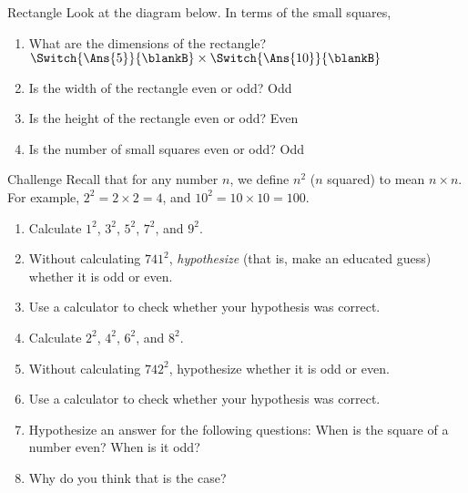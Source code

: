 \documentclass[12pt,letterpaper]{article}
\begin{document}
\begin{problem}{Rectangle}
 Look at the diagram below. In terms of the small squares,

 \begin{center}
 \end{center}

 \begin{enumerate}
  \item What are the dimensions of the rectangle? \hfill
  \(\Switch{\Ans{5}}{\blankB}\times\Switch{\Ans{10}}{\blankB}\)
  \item Is the width of the rectangle even or odd?
  \hfill Odd \hspace{1em} 
  \item Is the height of the rectangle even or odd?
  \hfill {} \hspace{1em} Even
  \item Is the number of small squares even or odd?
  \hfill Odd \hspace{1em} 
 \end{enumerate}
\end{problem}

\begin{problem}{Challenge}
 Recall that for any number $n$, we define $n^2$ ($n$ squared) to mean
 $n\times n$. For example, $2^2=2\times2=4$, and $10^2=10\times10=100$.

 \begin{enumerate}
  \item Calculate $1^2$, $3^2$, $5^2$, $7^2$, and $9^2$.
  \item Without calculating $741^2$, \emph{hypothesize} (that is, make an
  educated guess) whether it is odd or even.
  \item Use a calculator to check whether your hypothesis was correct.
  \item Calculate \(2^2\), $4^2$, $6^2$, and $8^2$.
  \item Without calculating $742^2$, hypothesize whether it is odd or even.
  \item Use a calculator to check whether your hypothesis was correct.
  \item Hypothesize an answer for the following questions:
  When is the square of a number even? When is it odd?
  \item Why do you think that is the case?
 \end{enumerate}
\end{problem}
\end{document}
